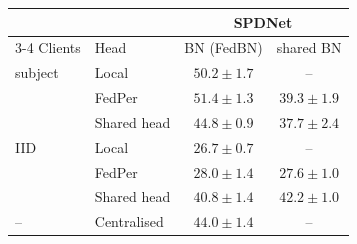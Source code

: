 \begin{tabular}{llcc}
\toprule
 & & \multicolumn{2}{c}{SPDNet} \\
\cmidrule(lr){3-4}
Clients & Head & BN (FedBN) & shared BN \\
\midrule
subject & Local & $\mathbf{50.2} \pm 1.7$ & -- \\
 & FedPer & $\mathbf{51.4} \pm 1.3$ & $39.3 \pm 1.9$ \\
 & Shared head & $\mathbf{44.8} \pm 0.9$ & $37.7 \pm 2.4$ \\
\midrule
IID & Local & $\mathbf{26.7} \pm 0.7$ & -- \\
 & FedPer & $\mathbf{28.0} \pm 1.4$ & $27.6 \pm 1.0$ \\
 & Shared head & $40.8 \pm 1.4$ & $\mathbf{42.2} \pm 1.0$ \\
\midrule
-- & Centralised & $\mathbf{44.0} \pm 1.4$ & -- \\
\bottomrule
\end{tabular}

